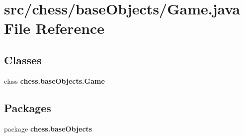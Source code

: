 \section{src/chess/base\+Objects/\+Game.java File Reference}
\label{_game_8java}
\subsection*{Classes}
\begin{DoxyCompactItemize}
\item 
class {\bf chess.\+base\+Objects.\+Game}
\end{DoxyCompactItemize}
\subsection*{Packages}
\begin{DoxyCompactItemize}
\item 
package {\bf chess.\+base\+Objects}
\end{DoxyCompactItemize}
